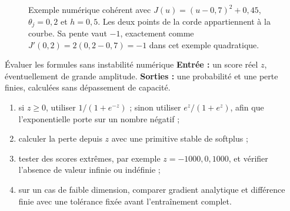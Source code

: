 \begin{figure}[htbp]
\centering
{}
\caption{Exemple numérique cohérent avec
$J(u)=(u-0{,}7)^2+0{,}45$, $\theta_j=0{,}2$ et $h=0{,}5$. Les deux points de la
corde appartiennent à la courbe. Sa pente vaut $-1$, exactement comme
$J'(0{,}2)=2(0{,}2-0{,}7)=-1$ dans cet exemple quadratique.}
\label{fig:finite-difference}
\end{figure}

\begin{procedure}{Évaluer les formules sans instabilité numérique}
\textbf{Entrée :} un score réel $z$, éventuellement de grande amplitude.
\textbf{Sorties :} une probabilité et une perte finies, calculées sans dépassement
de capacité.
\begin{enumerate}
  \item si $z\geq0$, utiliser $1/(1+e^{-z})$ ; sinon utiliser
        $e^z/(1+e^z)$, afin que l'exponentielle porte sur un nombre négatif ;
  \item calculer la perte depuis $z$ avec une primitive stable de softplus ;
  \item tester des scores extrêmes, par exemple $z=-1000,0,1000$, et vérifier
        l'absence de valeur infinie ou indéfinie ;
  \item sur un cas de faible dimension, comparer gradient analytique et différence
        finie avec une tolérance fixée avant l'entraînement complet.
\end{enumerate}
\end{procedure}
